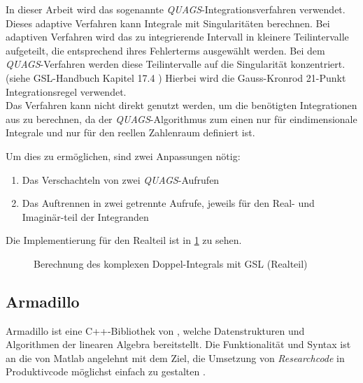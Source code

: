 
In dieser Arbeit wird das sogenannte \textit{QUAGS}-Integrationsverfahren verwendet. %
Dieses adaptive Verfahren kann Integrale mit Singularitäten berechnen. Bei adaptiven Verfahren wird das zu integrierende Intervall in kleinere Teilintervalle aufgeteilt, die entsprechend ihres Fehlerterms ausgewählt werden.
Bei dem \textit{QUAGS}-Verfahren werden diese Teilintervalle auf die Singularität konzentriert. (siehe GSL-Handbuch Kapitel 17.4 \cite{gsl})
Hierbei wird die Gauss-Kronrod 21-Punkt Integrationsregel verwendet.\\

Das Verfahren kann nicht direkt genutzt werden, um die benötigten Integrationen aus \cite*{gasperini:hal-03209144} zu berechnen, da 
der \textit{QUAGS}-Algorithmus zum einen nur für eindimensionale Integrale und nur für den reellen Zahlenraum definiert ist.

Um dies zu ermöglichen, sind zwei Anpassungen nötig:
\begin{enumerate}
    \item Das Verschachteln von zwei \textit{QUAGS}-Aufrufen
    \item Das Auftrennen in zwei getrennte Aufrufe, jeweils für den Real- und Imaginär-teil der Integranden
\end{enumerate}

Die Implementierung für den Realteil ist in \ref{integration_2d} zu sehen.

\begin{figure}
    
    \caption{Berechnung des komplexen Doppel-Integrals mit GSL (Realteil)}
    \label{integration_2d}
\end{figure}


\subsection{Armadillo}

Armadillo ist eine C++-Bibliothek von \citeauthor{armadillo}, welche Datenstrukturen und Algorithmen der linearen Algebra bereitstellt.
Die Funktionalität und Syntax ist an die von Matlab angelehnt mit dem Ziel, die Umsetzung von \textit{Researchcode} in Produktivcode möglichst einfach zu gestalten \cite{armadillo}.


